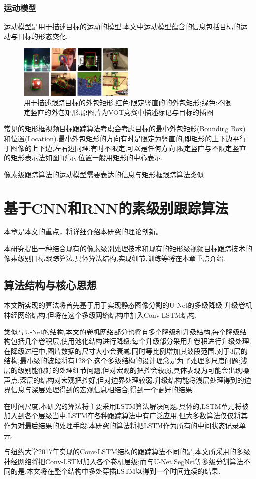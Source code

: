 \subsection{运动模型}
运动模型是用于描述目标的运动的模型.本文中运动模型蕴含的信息包括目标的运动与目标的形态变化.
\par
\begin{figure}[htbp!]
    \centering
    \includegraphics[width = 0.5\textwidth]{chap/img/overlap_examples.pdf}
    \caption{用于描述跟踪目标的外包矩形.红色:限定竖直的的外包矩形;绿色:不限定竖直的外包矩形.原图片为VOT竞赛中描述标记与目标的插图\supercite{VOT_TPAMI}}\label{fig:bunding_boxes}
\end{figure}
\par
常见的矩形框视频目标跟踪算法考虑会考虑目标的最小外包矩形(Bounding Box)和位置(Location).最小外包矩形的方向有时是限定为竖直的,即矩形的上下边平行于图像的上下边,左右边同理;有时不限定,可以是任何方向.限定竖直与不限定竖直的矩形表示法如图\ref{fig:bunding_boxes}所示.位置一般用矩形的中心表示.
\par
像素级跟踪算法的运动模型需要表达的信息与矩形框跟踪算法类似

\chapter{基于CNN和RNN的素级别跟踪算法}
本章是本文的重点，将详细介绍本研究的理论创新。
\par
本研究提出一种结合现有的像素级别处理技术和现有的矩形级视频目标跟踪技术的像素级别目标跟踪算法,具体算法结构,实现细节,训练等将在本章重点介绍.
\section{算法结构与核心思想}
本文所实现的算法将首先基于用于实现静态图像分割的U-Net\supercite{ronneberger2015u}的多级降级-升级卷机神经网络结构.但将在这个多级网络结构中加入Conv-LSTM结构.
\par
类似与U-Net的结构,本文的卷机网络部分也将有多个降级和升级结构;每个降级结构包括几个卷积层,使用池化结构进行降级;每个升级部分采用升卷积进行升级处理.在降级过程中,图片数据的尺寸大小会衰减,同时等比例增加其波段范围.对于3层的结构,最小级的波段将有128个.这个多级结构的设计理念是为了处理多尺度问题;浅层的级别能很好的处理细节问题,但对宏观的把控会较弱,具体表现为可能会出现噪声点;深层的结构对宏观把控好,但对边界处理较弱.升级结构能将浅层处理得到的边界信息与深层处理得到的宏观信息相结合,得到一个更好的结果.
\par
在时间尺度,本研究的算法将主要采用LSTM算法解决问题.具体的,LSTM单元将被加入到各个层级当中.LSTM在各种跟踪算法中有广泛应用,但大多数算法仅仅将其作为对最后结果的处理手段.本研究的算法将把LSTM作为所有的中间状态记录单元.
\par
与纽约大学2017年实现的Conv-LSTM结构的跟踪算法不同的是,本文所采用的多级神经网络将把Conv-LSTM加入各个卷机层级;而与U-Net,SegNet等多级分割算法不同的是,本文将在整个结构中多处穿插LSTM以得到一个时间连续的结果.
